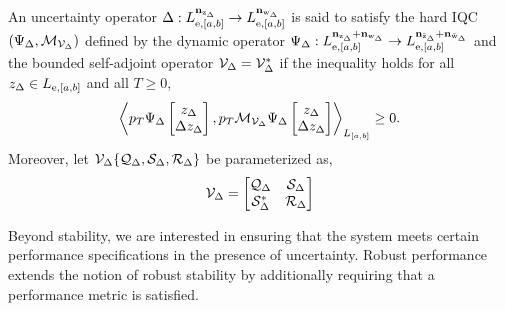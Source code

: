 \begin{definition}\label{def:uncertainty-iqc}

An uncertainty operator
$\Delta:
L_{{\mathrm{e}},[a,b]}^{\mathbf{n}_{{\mathrm{z}}_\Delta}}
\to
L_{{\mathrm{e}},[a,b]}^{\mathbf{n}_{{\mathrm{w}}_\Delta}}$
is said to satisfy the hard IQC $(\Psi_\Delta, \mathcal{M}_{\mathcal{V}_\Delta})$ defined by the dynamic operator
$\Psi_\Delta:
L^{\mathbf{n}_{{\mathrm{z}}_\Delta} + \mathbf{n}_{{\mathrm{w}}_\Delta}}_{{\mathrm{e}}, [a,b]}
\to
L^{\mathbf{n}_{\tilde{{\mathrm{z}}}_{\Delta}} + \mathbf{n}_{\tilde{{\mathrm{w}}}_{\Delta}}}_{{\mathrm{e}}, [a,b]}$
and 
the bounded self-adjoint operator $\mathcal{V}_\Delta = \mathcal{V}_\Delta^*$
if the inequality holds for all
$z_\Delta \in L_{{\mathrm{e}}, [a,b]}$ and all $T \geq 0$,
\begin{equation*}
\left\langle p_T \Psi_\Delta \begin{bmatrix}z_\Delta\\ \Delta z_\Delta\end{bmatrix}, p_T \mathcal{M}_{\mathcal{V}_\Delta}\Psi_\Delta\begin{bmatrix}z_\Delta\\ \Delta z_\Delta\end{bmatrix} \right\rangle
_{L_{[a,b]}}
\geq 0.
\end{equation*}
Moreover, let
$\mathcal{V}_\Delta\{\mathcal{Q}_\Delta, \mathcal{S}_\Delta, \mathcal{R}_\Delta\}$
be parameterized as,
\begin{equation*}
\mathcal{V}_\Delta =
\begin{bmatrix}
\mathcal{Q}_\Delta & \mathcal{S}_\Delta \\
\mathcal{S}_\Delta^* & \mathcal{R}_\Delta
\end{bmatrix}
\end{equation*}
\end{definition}
Beyond stability, we are interested in ensuring that the system meets certain
performance specifications in the presence of uncertainty.
Robust performance extends the notion of robust stability by additionally
requiring that a performance metric is satisfied.

